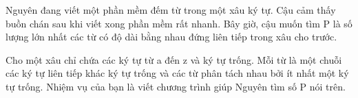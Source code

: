 Nguyên đang viết một phần mềm đếm từ trong một xâu ký tự. Cậu cảm thấy buồn chán sau khi viết xong phần mềm rất nhanh. Bây giờ, cậu muốn tìm P là số lượng lớn nhất các từ có độ dài bằng nhau đứng liên tiếp trong xâu cho trước.  

   Cho một xâu chỉ chứa các ký tự từ a đến z và ký tự trống. Mỗi từ là một chuỗi các ký tự liên tiếp khác ký tự trống và các từ phân tách nhau bởi ít nhất một ký tự trống. Nhiệm vụ của bạn là viết chương trình giúp Nguyên tìm số P nói trên.